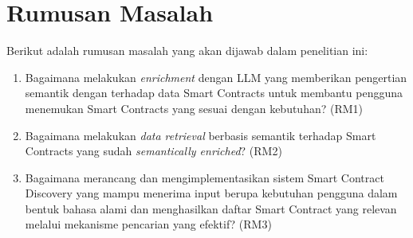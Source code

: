 \section{Rumusan Masalah}
\label{sec:rumusan-masalah}

Berikut adalah rumusan masalah yang akan dijawab dalam penelitian ini:
\begin{enumerate}

	\item Bagaimana melakukan \textit{enrichment} dengan LLM yang memberikan pengertian semantik dengan terhadap data Smart Contracts untuk membantu pengguna menemukan Smart Contracts yang sesuai dengan kebutuhan? (RM1)

	\item Bagaimana melakukan \textit{data retrieval} berbasis semantik terhadap Smart Contracts yang sudah \textit{semantically enriched}? (RM2)

	\item Bagaimana merancang dan mengimplementasikan sistem Smart Contract Discovery yang mampu menerima input berupa kebutuhan pengguna dalam bentuk bahasa alami dan menghasilkan daftar Smart Contract yang relevan melalui mekanisme pencarian yang efektif? (RM3)
\end{enumerate}



